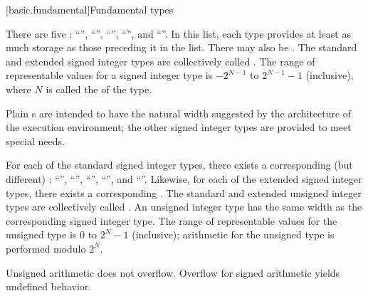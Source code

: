 [basic.fundamental]{Fundamental types}

\pnum
{}%
There are five :
%
%
%
%
%
``'', ``'', ``'',
``'', and ``''. In
this list, each type provides at least as much storage as those
preceding it in the list.
There may also be 
.
The standard and extended signed integer types are collectively called
.
The range of representable values for a signed integer type is
$-2^{N-1}$ to $2^{N-1}-1$ (inclusive),
where $N$ is called the  of the type.
%
\begin{note}
Plain s are intended to have
the natural width suggested by the architecture of the execution environment;
the other signed integer types are provided to meet special needs.
\end{note}

\pnum
{}%
For each of the standard signed integer types,
there exists a corresponding (but different)
:
%
%
%
%
%
``'', ``'',
``'', ``'', and
``''.
Likewise, for each of the extended signed integer types,
there exists a corresponding .
The standard and extended unsigned integer types
are collectively called .
An unsigned integer type has the same width 
as the corresponding signed integer type.
%
The range of representable values for the unsigned type is
$0$ to $2^N-1$ (inclusive);
arithmetic for the unsigned type is performed modulo $2^N$.
\begin{note}
Unsigned arithmetic does not overflow.
Overflow for signed arithmetic yields undefined behavior.
\end{note}

